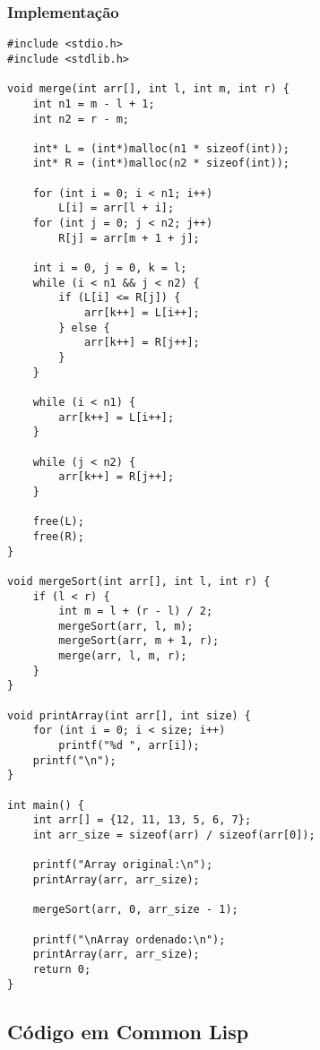 \documentclass{article}
\begin{document}
\subsubsection{Implementação}
\begin{verbatim}
#include <stdio.h>
#include <stdlib.h>

void merge(int arr[], int l, int m, int r) {
    int n1 = m - l + 1;
    int n2 = r - m;

    int* L = (int*)malloc(n1 * sizeof(int));
    int* R = (int*)malloc(n2 * sizeof(int));

    for (int i = 0; i < n1; i++)
        L[i] = arr[l + i];
    for (int j = 0; j < n2; j++)
        R[j] = arr[m + 1 + j];

    int i = 0, j = 0, k = l;
    while (i < n1 && j < n2) {
        if (L[i] <= R[j]) {
            arr[k++] = L[i++];
        } else {
            arr[k++] = R[j++];
        }
    }

    while (i < n1) {
        arr[k++] = L[i++];
    }

    while (j < n2) {
        arr[k++] = R[j++];
    }

    free(L);
    free(R);
}

void mergeSort(int arr[], int l, int r) {
    if (l < r) {
        int m = l + (r - l) / 2;
        mergeSort(arr, l, m);
        mergeSort(arr, m + 1, r);
        merge(arr, l, m, r);
    }
}

void printArray(int arr[], int size) {
    for (int i = 0; i < size; i++)
        printf("%d ", arr[i]);
    printf("\n");
}

int main() {
    int arr[] = {12, 11, 13, 5, 6, 7};
    int arr_size = sizeof(arr) / sizeof(arr[0]);

    printf("Array original:\n");
    printArray(arr, arr_size);

    mergeSort(arr, 0, arr_size - 1);

    printf("\nArray ordenado:\n");
    printArray(arr, arr_size);
    return 0;
}
\end{verbatim}

\subsection{Código em Common Lisp}
\end{document}
